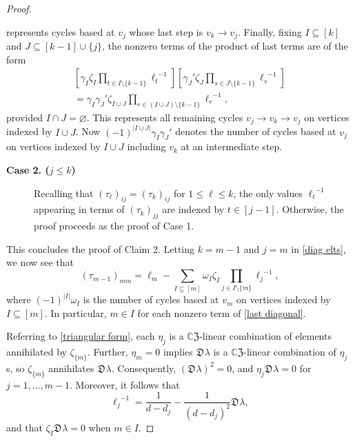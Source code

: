 \documentclass[10pt,a4paper]{amsart}
\newcommand{\CZ}{\mathbb{C}\mathfrak{Z}}
\newcommand{\zdu}{\mathfrak{D}\mspace{1mu}}
\begin{document}
\begin{proof}
\begin{description}
represents cycles based at $v_j$ whose last step is $v_k\to v_j$.
Finally, fixing $I\subseteq[k]$ and $J\subseteq[k-1]\cup\{j\}$,  the nonzero terms of the product of last terms are of the form
\begin{align}
\left[\gamma_I\zeta_I\prod_{t\in I\setminus\{k-1\}}{\ell_t}^{-1}\right]
\left[{\gamma_J}'\zeta_J\prod_{s\in J\setminus\{k-1\}}{\ell_s}^{-1}\right]\nonumber\\
=\gamma_I{\gamma_J}'\zeta_{I\cup J}\prod_{r\in (I\cup J)\setminus\{k-1\}}{\ell_r}^{-1},\end{align}
provided $I\cap J=\varnothing$.  This represents all remaining cycles $v_j\to v_k\to v_j$ on vertices indexed by $I\cup J$.  Now $(-1)^{|I\cup J|}\gamma_I{\gamma_J}'$ denotes the number of cycles based at $v_j$ on vertices indexed by $I\cup J$ including $v_k$ at an intermediate step.  
\end{description}

\begin{description}
\item [{\bf Case 2. ($j\le k$)}]
Recalling that $(\tau_\ell)_{ij}=(\tau_k)_{ij}$ for $1\le \ell\le k$, the only values ${\ell_t}^{-1}$ appearing in terms of $(\tau_k)_{jj}$ are indexed by $t\in [j-1]$.  Otherwise, the proof proceeds as the proof of Case 1.
\end{description}
This concludes the proof of Claim 2.  Letting $k=m-1$ and $j=m$ in \eqref{diag elts}, we now see that  \begin{equation}\label{last diagonal}
(\tau_{m-1})_{mm}=\ell_m-\sum_{I\subseteq [m]}\omega_I\zeta_I\prod_{j\in I\setminus\{m\}}{\ell_j}^{-1},
\end{equation}
where $(-1)^{|I|}\omega_I$ is the number of cycles based at $v_m$ on vertices indexed by $I\subseteq [m]$.  In particular, $m\in I$ for each nonzero term of \eqref{last diagonal}.

Referring to \eqref{triangular form}, each $\eta_j$ is a $\CZ$-linear combination of elements annihilated by $\zeta_{\{m\}}$.  Further, $\eta_m=0$ implies $\zdu\lambda$ is a $\CZ$-linear combination of $\eta_j$s, so $\zeta_{\{m\}}$ annihilates $\zdu\lambda$.  Consequently,  $(\zdu \lambda)^2=0$, and $\eta_j\zdu\lambda=0$ for $j=1, \ldots, m-1$.  Moreover,  it follows that \begin{equation*}
{\ell_j}^{-1}=\frac{1}{d-d_j}-\frac{1}{(d-d_j)^2}\zdu\lambda,
\end{equation*}
and that $\zeta_I\zdu\lambda =0$ when $m\in I$. 


\end{proof}
\end{document}
